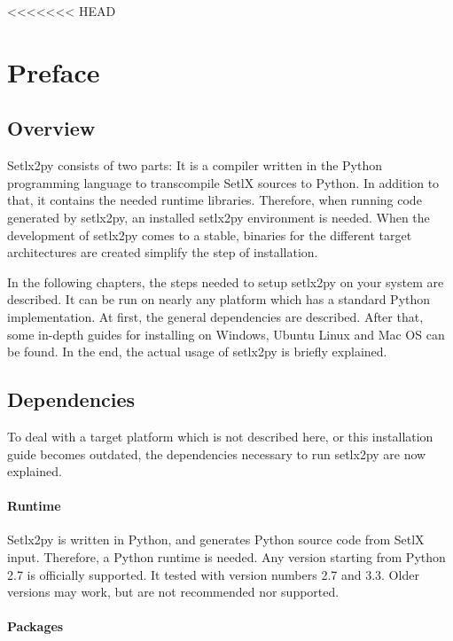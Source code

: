 <<<<<<< HEAD

\section{Preface}

\subsection{Overview}

Setlx2py consists of two parts: It is a compiler written in the Python programming language to transcompile SetlX sources to Python. In addition to that, it contains the needed runtime libraries. Therefore, when running code generated by setlx2py, an installed setlx2py environment is needed. When the development of setlx2py comes to a stable, binaries for the different target architectures are created simplify the step of installation.

In the following chapters, the steps needed to setup setlx2py on your system are described. It can be run on nearly any platform which has a standard Python implementation. At first, the general dependencies are described. After that, some in-depth guides for installing on Windows, Ubuntu Linux and Mac OS can be found. In the end, the actual usage of setlx2py is briefly explained.

\subsection{Dependencies}

To deal with a target platform which is not described here, or this installation guide becomes outdated, the dependencies necessary to run setlx2py are now explained.

\paragraph{Runtime}

Setlx2py is written in Python, and generates Python source code from SetlX input. Therefore, a Python runtime is needed. Any version starting from Python 2.7 is officially supported. It tested with version numbers 2.7 and 3.3. Older versions may work, but are not recommended nor supported.

\paragraph{Packages}

